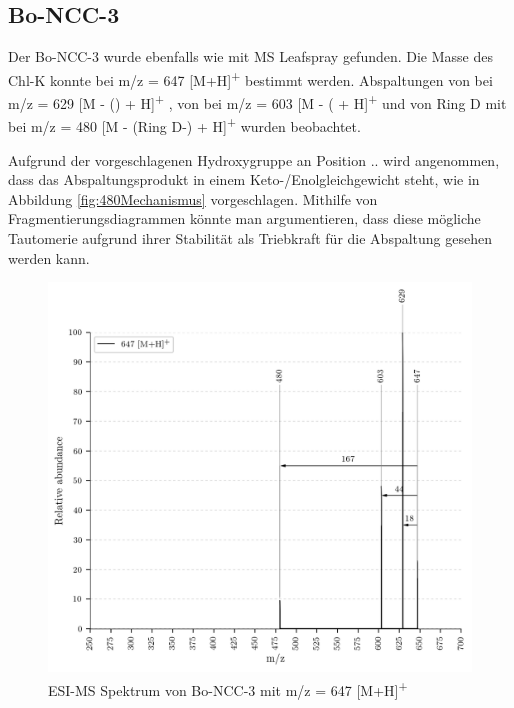 \pagebreak
\subsection{Bo-NCC-3} \label{sec:ESIMSBoNCC3}

Der Bo-NCC-3 wurde ebenfalls wie mit MS Leafspray gefunden. Die Masse des \gls{Chl-K} konnte bei m/z = 647 [M+H]\textsuperscript{+} bestimmt werden. Abspaltungen von  bei m/z = 629 [M - () + H]\textsuperscript{+} , von  bei m/z = 603 [M - ( + H]\textsuperscript{+} und von Ring D mit  bei m/z = 480 [M - (Ring D-) + H]\textsuperscript{+} wurden beobachtet. 

Aufgrund der vorgeschlagenen Hydroxygruppe an Position .. wird angenommen, dass das Abspaltungsprodukt in einem Keto-/Enolgleichgewicht steht, wie in Abbildung \ref{fig:480Mechanismus} vorgeschlagen. Mithilfe von Fragmentierungsdiagrammen könnte man argumentieren, dass diese mögliche Tautomerie aufgrund ihrer Stabilität als Triebkraft für die Abspaltung gesehen werden kann.

\begin{figure}[!htbp]
  \centering
  \includegraphics[width=\textwidth, height=0.6\textwidth]{figures/Kapitel7/Kataboliten/VWA_MS_647.png}
  \caption[ESI-MS Spektrum von Bo-NCC-3, Quelle: Autor]{ESI-MS Spektrum von Bo-NCC-3 mit m/z = 647 [M+H]\textsuperscript{+}}
  \label{fig:647MH}
\end{figure}

